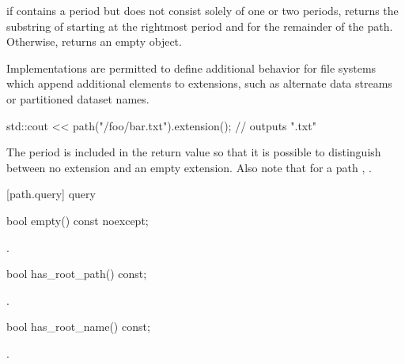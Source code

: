 \begin{itemdescr}
\pnum
\returns if  contains a period but does not
  consist solely of one or two periods, returns
  the substring of  starting at the rightmost period
  and for the remainder of the path. Otherwise, returns an empty  object.

\pnum
\remarks Implementations are permitted to define additional
  behavior for file systems which append additional elements to extensions, such
  as alternate data streams or partitioned dataset names.

\pnum
\begin{example}
\begin{codeblock}
std::cout << path("/foo/bar.txt").extension(); // outputs ".txt"
\end{codeblock}
\end{example}

\pnum
\begin{note} The period is included in the return value so that it is
  possible to distinguish between no extension and an empty extension. Also note
  that for a path , .
  \end{note}
\end{itemdescr}

[path.query]{ query}

%
\begin{itemdecl}
bool empty() const noexcept;
\end{itemdecl}

\begin{itemdescr}
\pnum
\returns {}.
\end{itemdescr}

%
\begin{itemdecl}
bool has_root_path() const;
\end{itemdecl}

\begin{itemdescr}
\pnum
\returns {}.
\end{itemdescr}

%
\begin{itemdecl}
bool has_root_name() const;
\end{itemdecl}

\begin{itemdescr}
\pnum
\returns {}.
\end{itemdescr}

